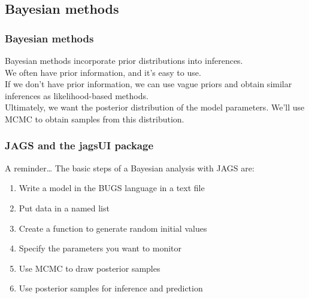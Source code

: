 \documentclass[color=usenames,dvipsnames,handout]{beamer}\usepackage[]{graphicx}\usepackage[]{xcolor}
\begin{document}
\subsection{Bayesian methods}


\begin{frame}
  \frametitle{Bayesian methods}
  Bayesian methods incorporate prior distributions into inferences. \\
  \pause
  \vfill
  We often have prior information, and it's easy to use. \\
  \pause
  \vfill
  If we don't have prior information, we can use vague priors and
  obtain similar inferences as likelihood-based methods. \\
  \pause
  \vfill
  Ultimately, we want the posterior distribution of the model
  parameters. We'll use MCMC to obtain samples from this
  distribution. 
\end{frame}




\begin{frame}
  \frametitle{JAGS and the jagsUI package}
  A reminder\dots
  \vfill
  The basic steps of a Bayesian analysis with JAGS are:
  \begin{enumerate}%
    \item Write a model in the BUGS language in a text file
    \item Put data in a named list
    \item Create a function to generate random initial values
    \item Specify the parameters you want to monitor
    \item Use MCMC to draw posterior samples
    \item Use posterior samples for inference and prediction
  \end{enumerate}
\end{frame}
\end{document}
